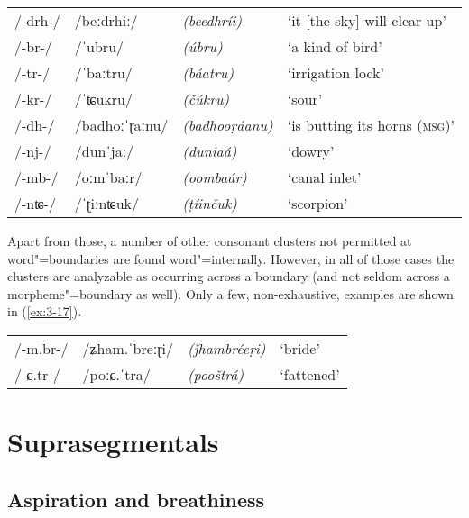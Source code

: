 \begin{exe}
\extab
\label{ex:3-16}
\begin{tabular}{ l l l l }
/-drh-/ &
/beːdrhiː/ &
\textit{(beedhríi)} &
`it [the sky] will clear up'\\
/-br-/ &
/ˈubru/ &
\textit{(úbru)} &
`a kind of bird'\\
/-tr-/ &
/ˈbaːtru/ &
\textit{(báatru)} &
`irrigation lock'\\
/-kr-/ &
/ˈʨukru/ &
\textit{(čúkru)} &
`sour'\\
/-dh-/ &
/badhoːˈɽaːnu/ &
\textit{(badhooṛáanu)} &
`is butting its horns (\textsc{msg)}'\\
/-nj-/ &
/dunˈjaː/ &
\textit{(duniaá)} &
`dowry'\\
/-mb-/ &
/oːmˈbaːr/ &
\textit{(oombaár)} &
`canal inlet'\\
/-nʨ-/ &
/ˈʈiːnʨuk/ &
\textit{(ṭíinčuk)} &
`scorpion'\\
\end{tabular}
\end{exe}


Apart from those, a number of other consonant clusters not permitted at word"=boundaries are found word"=internally. However, in all of those cases the clusters are analyzable as occurring across a  boundary (and not seldom across a morpheme"=boundary as well). Only a few, non-exhaustive, examples are shown in (\ref{ex:3-17}).


\begin{exe}
\extab
\label{ex:3-17}
\begin{tabular}{ l l l l }
/-m.br-/ &
/ʑham.ˈbreːɽi/ &
\textit{(ǰhambréeṛi)} &
`bride'\\
/-ɕ.tr-/ &
/poːɕ.ˈtra/ &
\textit{(pooštrá)} &
`fattened'\\

\end{tabular}
\end{exe}


\section{Suprasegmentals}
\label{sec:3-4}

\subsection{Aspiration and breathiness}
\label{subsec:3-4-1}

